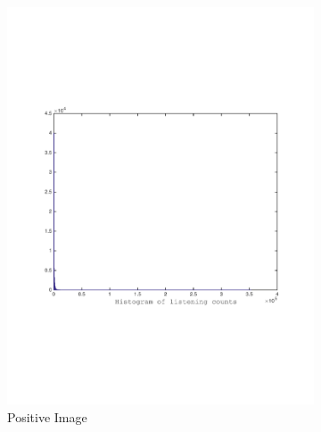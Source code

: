 \begin{figure}[h]
  \centering
  \begin{subfigure}[b]{0.45\textwidth}
   \includegraphics[width=\textwidth]{figures/histYtrain_crop.pdf}
    \caption{Positive Image}
  \end{subfigure}
  \begin{subfigure}[b]{0.45\textwidth}

\end{subfigure}
\end{figure}
